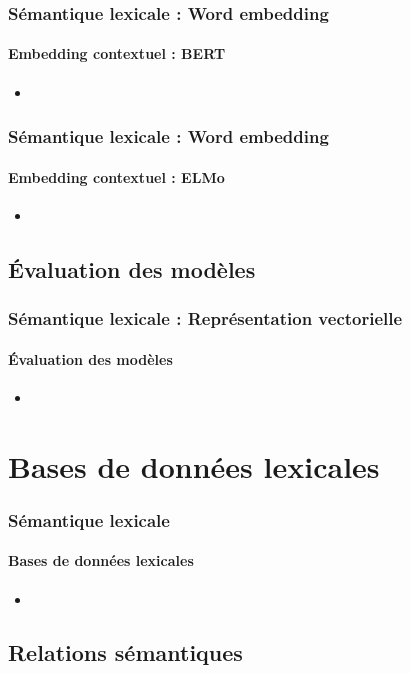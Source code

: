 \documentclass[xcolor=table]{beamer}
\begin{document}
\begin{frame}
\frametitle{Sémantique lexicale : Word embedding}
\framesubtitle{Embedding contextuel : BERT}

\begin{itemize}
	\item 
\end{itemize}

\end{frame}


\begin{frame}
\frametitle{Sémantique lexicale : Word embedding}
\framesubtitle{Embedding contextuel : ELMo}

\begin{itemize}
	\item 
\end{itemize}

\end{frame}

\subsection{Évaluation des modèles}

\begin{frame}
	\frametitle{Sémantique lexicale : Représentation vectorielle}
	\framesubtitle{Évaluation des modèles}
	\begin{itemize}
		\item 
	\end{itemize}
	
\end{frame}

\section{Bases de données lexicales}

\begin{frame}
\frametitle{Sémantique lexicale}
\framesubtitle{Bases de données lexicales}

\begin{itemize}
	\item 	
\end{itemize}

\end{frame}

\subsection{Relations sémantiques}
\end{document}
